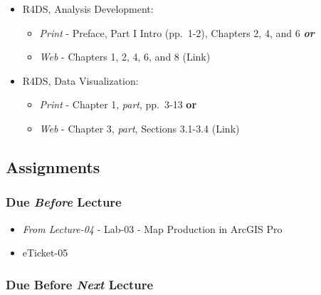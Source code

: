 \documentclass[]{book}
\providecommand{\tightlist}{%
  \setlength{\itemsep}{0pt}\setlength{\parskip}{0pt}}
\begin{document}
\begin{itemize}
\tightlist
\item
  R4DS, Analysis Development:

  \begin{itemize}
  \tightlist
  \item
    \emph{Print} - Preface, Part I Intro (pp.~1-2), Chapters 2, 4, and 6 \textbf{\emph{or}}
  \item
    \emph{Web} - Chapters 1, 2, 4, 6, and 8 (Link)
  \end{itemize}
\item
  R4DS, Data Visualization:

  \begin{itemize}
  \tightlist
  \item
    \emph{Print} - Chapter 1, \emph{part}, pp.~3-13 \textbf{or}
  \item
    \emph{Web} - Chapter 3, \emph{part}, Sections 3.1-3.4 (Link)
  \end{itemize}
\end{itemize}

\hypertarget{assignments-6}{%
\subsection*{Assignments}\label{assignments-6}}

\hypertarget{due-before-lecture-4}{%
\subsubsection*{\texorpdfstring{Due \emph{Before} Lecture}{Due Before Lecture}}\label{due-before-lecture-4}}

\begin{itemize}
\tightlist
\item
  \emph{From Lecture-04} - Lab-03 - Map Production in ArcGIS Pro
\item
  eTicket-05
\end{itemize}

\hypertarget{due-before-next-lecture-3}{%
\subsubsection*{\texorpdfstring{Due Before \emph{Next} Lecture}{Due Before Next Lecture}}\label{due-before-next-lecture-3}}
\end{document}
